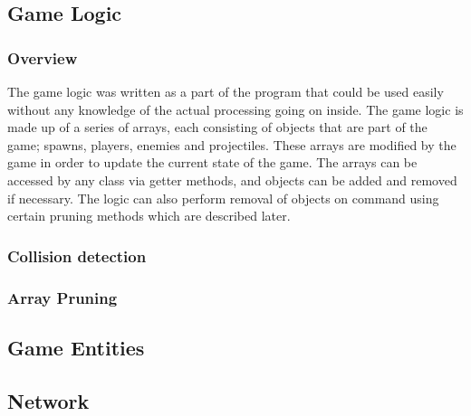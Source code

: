 \subsection{Game Logic}
\subsubsection{Overview}
The game logic was written as a part of the program that could be used easily without any knowledge of the actual processing going on inside. The game logic is made up of a series of arrays, each consisting of objects that are part of the game; spawns, players, enemies and projectiles. These arrays are modified by the game in order to update the current state of the game. The arrays can be accessed by any class via getter methods, and objects can be added and removed if necessary. The logic can also perform removal of objects on command using certain pruning methods which are described later.
\subsubsection{Collision detection}
\subsubsection{Array Pruning}
\subsection{Game Entities}
\subsection{Network}


